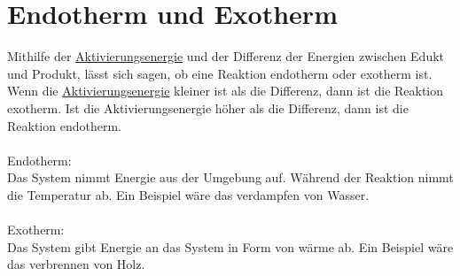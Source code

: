 
\section{Endotherm und Exotherm}\label{sec:endo_exotherm}
Mithilfe der \hyperref[sec:aktivierungsenergie]{Aktivierungsenergie} und der Differenz der Energien zwischen Edukt und Produkt,
lässt sich sagen, ob eine Reaktion endotherm oder exotherm ist.
Wenn die \hyperref[sec:aktivierungsenergie]{Aktivierungsenergie} kleiner ist als die Differenz, dann ist die Reaktion exotherm.
Ist die Aktivierungsenergie höher als die Differenz, dann ist die Reaktion endotherm. \\ \\
Endotherm:\\
Das System nimmt Energie aus der Umgebung auf. 
Während der Reaktion nimmt die Temperatur ab.
Ein Beispiel wäre das verdampfen von Wasser. \\ \\
Exotherm: \\
Das System gibt Energie an das System in Form von wärme ab.
Ein Beispiel wäre das verbrennen von Holz.

